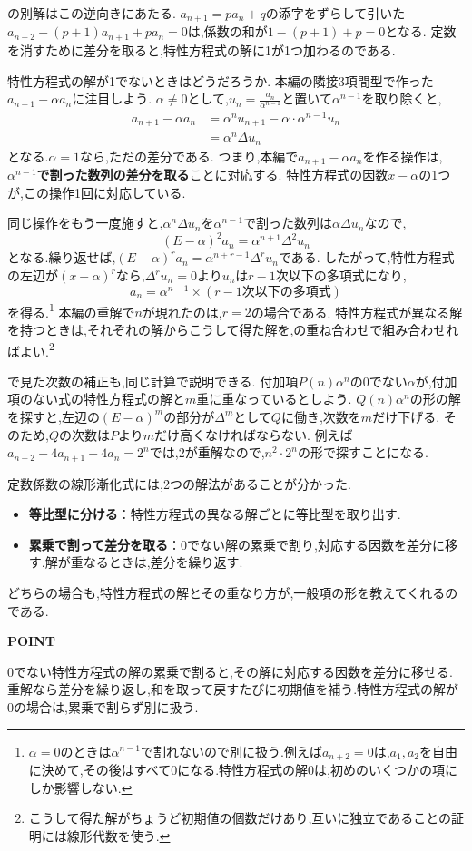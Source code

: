 の別解はこの逆向きにあたる.
$a_{n+1}=pa_n+q$の添字をずらして引いた$a_{n+2}-(p+1)a_{n+1}+pa_n=0$は,係数の和が$1-(p+1)+p=0$となる.
定数を消すために差分を取ると,特性方程式の解に1が1つ加わるのである.

特性方程式の解が1でないときはどうだろうか.
本編の隣接3項間型で作った$a_{n+1}-\alpha a_n$に注目しよう.
$\alpha\ne0$として,$u_n=\frac{a_n}{\alpha^{n-1}}$と置いて$\alpha^{n-1}$を取り除くと,
\[
  \begin{aligned}
    a_{n+1}-\alpha a_n
    &=\alpha^nu_{n+1}-\alpha\cdot\alpha^{n-1}u_n\\
    &=\alpha^n\Delta u_n
  \end{aligned}
\]
となる.$\alpha=1$なら,ただの差分である.
つまり,本編で$a_{n+1}-\alpha a_n$を作る操作は,\textbf{$\alpha^{n-1}$で割った数列の差分を取る}ことに対応する.
特性方程式の因数$x-\alpha$の1つが,この操作1回に対応している.

同じ操作をもう一度施すと,$\alpha^n\Delta u_n$を$\alpha^{n-1}$で割った数列は$\alpha\Delta u_n$なので,
\[
  (E-\alpha)^2a_n=\alpha^{n+1}\Delta^2u_n
\]
となる.繰り返せば,$(E-\alpha)^ra_n=\alpha^{n+r-1}\Delta^ru_n$である.
したがって,特性方程式の左辺が$(x-\alpha)^r$なら,$\Delta^ru_n=0$より$u_n$は$r-1$次以下の多項式になり,
\[
  a_n=\alpha^{n-1}\times(r-1\text{次以下の多項式})
\]
を得る.\footnote{$\alpha=0$のときは$\alpha^{n-1}$で割れないので別に扱う.例えば$a_{n+2}=0$は,$a_1,a_2$を自由に決めて,その後はすべて0になる.特性方程式の解0は,初めのいくつかの項にしか影響しない.}
本編の重解で$n$が現れたのは,$r=2$の場合である.
特性方程式が異なる解を持つときは,それぞれの解からこうして得た解を,の重ね合わせで組み合わせればよい.\footnote{こうして得た解がちょうど初期値の個数だけあり,互いに独立であることの証明には線形代数を使う.}

で見た次数の補正も,同じ計算で説明できる.
付加項$P(n)\alpha^n$の0でない$\alpha$が,付加項のない式の特性方程式の解と$m$重に重なっているとしよう.
$Q(n)\alpha^n$の形の解を探すと,左辺の$(E-\alpha)^m$の部分が$\Delta^m$として$Q$に働き,次数を$m$だけ下げる.
そのため,$Q$の次数は$P$より$m$だけ高くなければならない.
例えば$a_{n+2}-4a_{n+1}+4a_n=2^n$では,$2$が重解なので,$n^2\cdot2^n$の形で探すことになる.

定数係数の線形漸化式には,2つの解法があることが分かった.
\begin{itemize}
  \item \textbf{等比型に分ける}：特性方程式の異なる解ごとに等比型を取り出す.
  \item \textbf{累乗で割って差分を取る}：0でない解の累乗で割り,対応する因数を差分に移す.解が重なるときは,差分を繰り返す.
\end{itemize}
どちらの場合も,特性方程式の解とその重なり方が,一般項の形を教えてくれるのである.

\begin{bookpoint}
  \textbf{POINT}\par
  0でない特性方程式の解の累乗で割ると,その解に対応する因数を差分に移せる.
  重解なら差分を繰り返し,和を取って戻すたびに初期値を補う.特性方程式の解が0の場合は,累乗で割らず別に扱う.
\end{bookpoint}
